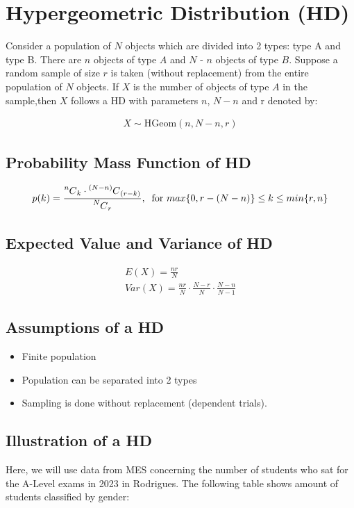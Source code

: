 \documentclass{article}
\newcommand\Mycomb[2][^n]{\prescript{#1\mkern-0.5mu}{}C_{#2}}
\begin{document}
\section{Hypergeometric Distribution (HD)}
Consider a population of $N$ objects which are divided into 2 types: type A and type B.
There are
$n$ objects of type $A$ and $N$ - $n$ objects of type $B$.
Suppose a random sample of size $r$ is taken
(without replacement) from the entire population of $N$ objects. If $X$ 
is the number of objects of
type $A$ in the sample,then $X$ follows a HD with parameters $n$, 
$N-n$ and r denoted by:

\begin{gather*}
  X \sim \text{HGeom}(n, N-n, r)
\end{gather*}

\subsection{Probability Mass Function of HD}

\begin{gather*}
  p(k) =  \frac{\Mycomb[n]{k} \cdot \Mycomb[(N-n)]{(r-k)}}
  {\Mycomb[N]{r}}, \; \;
  \text{for } max\{ 0, r - (N - n) \} \leq k \leq min\{r, n\}
\end{gather*}

\subsection{Expected Value and Variance of HD}
\begin{gather*}
  E(X) = \frac{nr}{N} \\[5pt]
  Var(X) = \frac{nr}{N} \cdot \frac{N -r}{N} \cdot \frac{N-n}{N-1}
\end{gather*}

\subsection{Assumptions of a HD}
\begin{itemize}
  \item Finite population
  \item Population can be separated into 2 types
  \item Sampling is done without replacement (dependent trials).
\end{itemize}

\subsection{Illustration of a HD}
Here, we will use data from MES concerning the number of students
who sat for the A-Level exams in 2023 in Rodrigues. The following
table shows amount of students classified by gender:
\end{document}
